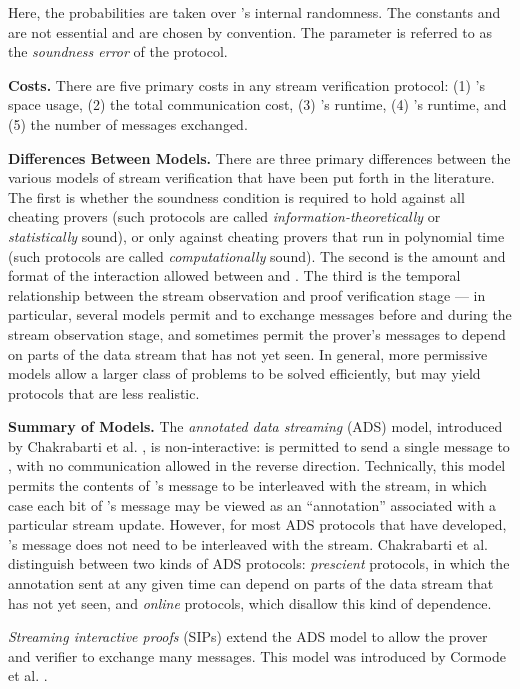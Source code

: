 \documentclass[11pt, letterpaper]{article}
\begin{document}
Here, the probabilities are taken over 's internal randomness. The constants  and  are not essential and are chosen by convention. The parameter
 is referred to as the \emph{soundness error} of the protocol.

\medskip
\noindent \textbf{Costs.}
There are five primary costs in any stream verification protocol: (1) 's space usage, (2) the total communication cost, (3) 's runtime, (4) 's runtime, and (5) the number of messages exchanged. 

\medskip
\noindent \textbf{Differences Between Models.}
There are three primary differences between the various models of stream verification that have been put forth in the literature. The first is whether the soundness condition is required to hold against all cheating provers (such protocols are called \emph{information-theoretically} or \emph{statistically} sound), or only against cheating provers that run in polynomial time (such protocols are called \emph{computationally} sound). The second is the amount and format of the interaction allowed between  and .  The third is the temporal relationship between the stream observation and proof verification stage --- in particular, several models permit  and  to exchange messages before and during the stream observation stage, and sometimes permit the prover's messages to depend on parts of the data stream that  has not yet seen. 
In general, more permissive models allow a larger class of problems to be solved efficiently, but may yield protocols that are less realistic.

\medskip
\noindent \textbf{Summary of Models.}
The \emph{annotated data streaming} (ADS) model, introduced by Chakrabarti et al. \cite{icalp}, is non-interactive:  is permitted to send a single message to , with no communication allowed in the reverse direction. Technically, this model permits the contents of 's message to be interleaved with the stream, in which case each bit of 's message may be viewed as an ``annotation'' associated with a particular stream update. However, for most ADS protocols that have developed, 's message does not need to be interleaved with the stream.
Chakrabarti et al. \cite{icalp} distinguish between two kinds of ADS protocols: \emph{prescient} protocols, in which the annotation sent at any given time can depend on parts of the data stream that  has not yet seen, and \emph{online} protocols, which disallow this kind of dependence.

\emph{Streaming interactive proofs} (SIPs) extend the ADS model to allow the prover and verifier to exchange many messages. This model was introduced by Cormode et al. \cite{vldb}.
\end{document}

